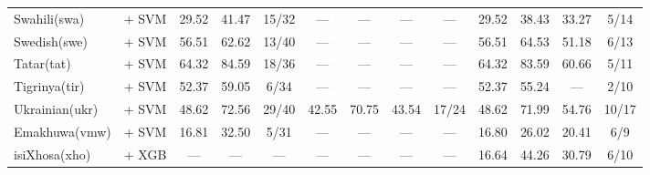 \begin{table*}[h]
{\begin{tabular}{l|c|ccc|cccc|cccc}
            Swahili(swa)                            & \citep{wang2024multilingual}      + SVM                                                      & 29.52                        & 41.47                        & 15/32                       & —             & —             & —                 & —             & 29.52         & 38.43         & 33.27             & 5/14          \\
            Swedish(swe)                            & \citep{wang2024multilingual}     + SVM                                                       & 56.51                        & 62.62                        & 13/40                       & —             & —             & —                 & —             & 56.51         & 64.53         & 51.18             & 6/13          \\
            Tatar(tat)                              & \citep{wang2024multilingual}    + SVM                                                        & 64.32                        & 84.59                        & 18/36                       & —             & —             & —                 & —             & 64.32         & 83.59         & 60.66             & 5/11          \\
            Tigrinya(tir)                           & \citep{wang2024multilingual}    + SVM                                                        & 52.37                        & 59.05                        & 6/34                        & —             & —             & —                 & —             & 52.37         & 55.24         & —                 & 2/10          \\
            Ukrainian(ukr)                          & \citep{sturua2024jinaembeddingsv3multilingualembeddingstask}   + SVM                         & 48.62                        & 72.56                        & 29/40                       & 42.55         & 70.75         & 43.54             & 17/24         & 48.62         & 71.99         & 54.76             & 10/17         \\
            Emakhuwa(vmw)                           & \citep{sturua2024jinaembeddingsv3multilingualembeddingstask}   + SVM                         & 16.81                        & 32.50                        & 5/31                        & —             & —             & —                 & —             & 16.80         & 26.02         & 20.41             & 6/9           \\
            isiXhosa(xho)                           & \citep{wang2024multilingual}     + XGB                                                       & —                            & —                            & —                           & —             & —             & —                 & —             & 16.64         & 44.26         & 30.79             & 6/10          \\

\end{tabular}}
\end{table*}
